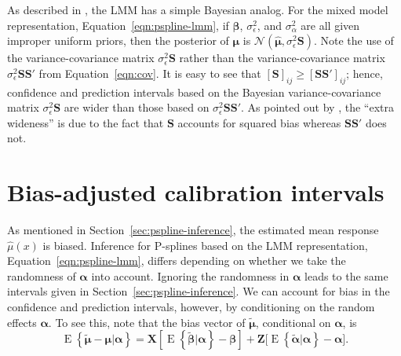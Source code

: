 \documentclass[cmfont,usenames,dvipsnames,leqno]{afit-etd}\usepackage[]{graphicx}\usepackage[]{color}
\newcommand{\mc}[1]{\ensuremath{\mathcal{#1}}}
\newcommand{\wh}[1]{\ensuremath{\widehat{#1}}}
\newcommand{\wt}[1]{\ensuremath{\widetilde{#1}}}
\newcommand{\E}{\operatorname{E}}
\begin{document}
As described in \citet{robinson_that_1991}, the \ac{LMM} has a simple Bayesian analog. For the mixed model representation, Equation~\eqref{eqn:pspline-lmm}, if $\bm{\beta}$, $\sigma_\epsilon^2$, and $\sigma_\alpha^2$ are all given improper uniform priors, then the posterior of $\bm{\mu}$ is $\mc{N}\left( \wh{\bm{\mu}}, \sigma_\epsilon^2 \bm{S} \right)$. Note the use of the variance-covariance matrix $\sigma_\epsilon^2\bm{S}$ rather than the variance-covariance matrix $\sigma_\epsilon^2\bm{S}\bm{S}'$ from Equation~\eqref{eqn:cov}. It is easy to see that $\left[\bm{S}\right]_{ij} \ge \left[\bm{S}\bm{S}'\right]_{ij}$; hence, confidence and prediction intervals based on the Bayesian variance-covariance matrix $\sigma_\epsilon^2\bm{S}$ are wider than those based on $\sigma_\epsilon^2\bm{S}\bm{S}'$. As pointed out by \citet{hastie_gams_1990}, the ``extra wideness'' is due to the fact that $\bm{S}$ accounts for squared bias whereas $\bm{S}\bm{S}'$ does not.

\section{Bias-adjusted calibration intervals}
\label{sec:adjusted-calibration}
As mentioned in Section~\ref{sec:pspline-inference}, the estimated mean response $\wh{\mu}(x)$ is biased. Inference for \ac{P-spline}s based on the \ac{LMM} representation, Equation~\eqref{eqn:pspline-lmm}, differs depending on whether we take the randomness of $\bm{\alpha}$ into account. Ignoring the randomness in $\bm{\alpha}$ leads to the same intervals given in Section~\ref{sec:pspline-inference}. We can account for bias in the confidence and prediction intervals, however, by conditioning on the random effects $\bm{\alpha}$. To see this, note that the bias vector of $\wt{\bm{\mu}}$, conditional on $\bm{\alpha}$, is 
\begin{equation}
\label{eqn:conditional-bias}
  \E\left\{\wt{\bm{\mu}} - \bm{\mu} | \bm{\alpha}\right\} = \bm{X}\left[ \E\left\{\wt{\bm{\beta}} | \bm{\alpha}\right\} - \bm{\beta} \right] + \bm{Z}\Big[ \E\left\{\wt{\bm{\alpha}} | \bm{\alpha}\right\} - \bm{\alpha} \Big].
\end{equation}
\end{document}
